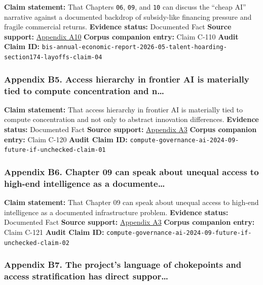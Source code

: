 \documentclass[
  american,
  11pt,
  letterpaper,
]{article}
\begin{document}
\textbf{Claim statement:} That Chapters \texttt{06}, \texttt{09}, and
\texttt{10} can discuss the ``cheap AI'' narrative against a documented
backdrop of subsidy-like financing pressure and fragile commercial
returns. \textbf{Evidence status:} Documented Fact \textbf{Source
support:}
\hyperref[ch-09-appendix-a10-annual-economic-report-2026]{Appendix A10}
\textbf{Corpus companion entry:} Claim C-110 \textbf{Audit Claim ID:}
\texttt{bis-annual-economic-report-2026-05-talent-hoarding-section174-layoffs-claim-04}

\subsubsection{Appendix B5. Access hierarchy in frontier AI is
materially tied to compute concentration and
n\ldots{}}\label{ch-09-appendix-b5-access-hierarchy-in-frontier-ai-is-materially-tied-to-compute-concentration-and-n}

\textbf{Claim statement:} That access hierarchy in frontier AI is
materially tied to compute concentration and not only to abstract
innovation differences. \textbf{Evidence status:} Documented Fact
\textbf{Source support:}
\hyperref[ch-09-appendix-a3-computing-power-and-the-governance-of-artificial-intelligence]{Appendix
A3} \textbf{Corpus companion entry:} Claim C-120 \textbf{Audit Claim
ID:} \texttt{compute-governance-ai-2024-09-future-if-unchecked-claim-01}

\subsubsection{Appendix B6. Chapter 09 can speak about unequal access to
high-end intelligence as a
documente\ldots{}}\label{ch-09-appendix-b6-chapter-09-can-speak-about-unequal-access-to-high-end-intelligence-as-a-documente}

\textbf{Claim statement:} That Chapter 09 can speak about unequal access
to high-end intelligence as a documented infrastructure problem.
\textbf{Evidence status:} Documented Fact \textbf{Source support:}
\hyperref[ch-09-appendix-a3-computing-power-and-the-governance-of-artificial-intelligence]{Appendix
A3} \textbf{Corpus companion entry:} Claim C-121 \textbf{Audit Claim
ID:} \texttt{compute-governance-ai-2024-09-future-if-unchecked-claim-02}

\subsubsection{Appendix B7. The project's language of chokepoints and
access stratification has direct
suppor\ldots{}}\label{ch-09-appendix-b7-the-project-s-language-of-chokepoints-and-access-stratification-has-direct-suppor}
\end{document}
